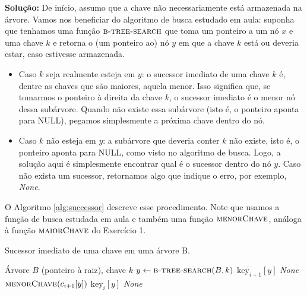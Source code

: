 \textbf{Solução:}
De início, assumo que a chave não necessariamente está armazenada na árvore.
Vamos nos beneficiar do algoritmo de busca estudado em aula: suponha que tenhamos uma função $\textsc{b-tree-search}$ que toma um ponteiro a um nó $x$ e uma chave $k$ e retorna o (um ponteiro ao) nó $y$ em que a chave $k$ está ou deveria estar, caso estivesse armazenada.

\begin{itemize}
    \item Caso $k$ seja realmente esteja em $y$: o sucessor imediato de uma chave $k$ é, dentre as chaves que são maiores, aquela menor. Isso significa que, se tomarmos o ponteiro à direita da chave $k$, o sucessor imediato é o menor nó dessa subárvore. Quando não existe essa subárvore (isto é, o ponteiro aponta para NULL), pegamos simplesmente a próxima chave dentro do nó.
    \item Caso $k$ não esteja em $y$: a subárvore que deveria conter $k$ não existe, isto é, o ponteiro aponta para NULL, como visto no algoritmo de busca. Logo, a solução aqui é simplesmente encontrar qual é o sucessor dentro do nó $y$. Caso não exista um sucessor, retornamos algo que indique o erro, por exemplo, \textit{None}.
\end{itemize}

O Algoritmo \ref{alg:successor} descreve esse procedimento. Note que usamos a função de busca estudada em aula e também uma função $\textsc{menorChave}$, análoga à função $\textsc{maiorChave}$ do Exercício 1.

\begin{algorithm}
    \caption{Sucessor imediato de uma chave em uma árvore B.}
    \label{alg:successor}
    \begin{algorithmic}
        \Require Árvore $B$ (ponteiro à raiz), chave $k$
        \State $y \gets \textsc{b-tree-search}(B, k)$ 
             
                 
                        \State \Return $\text{key}_{i+1}[y]$ 
                    \Else
                        \State \Return \textit{None} 
                    \EndIf
                \Else
                    \State \Return $\textsc{menorChave}(c_{i+1}[y])$ 
                \EndIf
            \EndIf
             
                \State \Return $\text{key}_i[y]$
            \EndIf
        \EndFor
        \State \Return \textit{None} 
    \end{algorithmic}
\end{algorithm}
